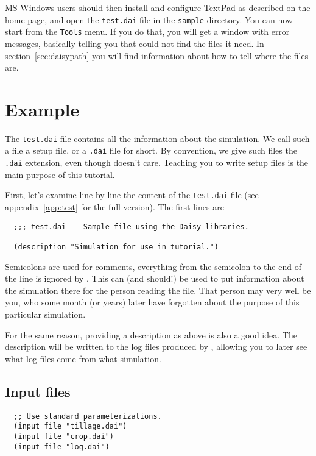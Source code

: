 \documentclass[a4paper,11pt]{article}
\begin{document}
MS Windows users should then install and configure TextPad as
described on the \daisy{} home page, and open the \texttt{test.dai}
file in the \texttt{sample} directory.  You can now start \daisy{}
from the \texttt{Tools} menu.  If you do that, you will get a window
with error messages, basically telling you that \daisy{} could not
find the files it need.  In section~\ref{sec:daisypath} you will find
information about how to tell \daisy{} where the files are.

\section{Example}

The \texttt{test.dai} file contains all the information about the
simulation.  We call such a file a \daisy{} setup file, or a
\texttt{.dai} file for short.  By convention, we give such files the
\texttt{.dai} extension, even though \daisy{} doesn't care.  Teaching
you to write \daisy{} setup files is the main purpose of this
tutorial.

First, let's examine line by line the content of the \texttt{test.dai}
file (see appendix~\ref{app:test} for the full version).  The first
lines are

\begin{verbatim}
  ;;; test.dai -- Sample file using the Daisy libraries.

  (description "Simulation for use in tutorial.")
\end{verbatim}

Semicolons are used for comments, everything from the semicolon to the
end of the line is ignored by \daisy{}.  This can (and should!) be
used to put information about the simulation there for the person
reading the file.  That person may very well be you, who some month
(or years) later have forgotten about the purpose of this particular
simulation.

For the same reason, providing a description as above is also a good
idea.  The description will be written to the log files produced by
\daisy{}, allowing you to later see what log files come from what
simulation.

\subsection{Input files}
\label{sec:ex-input}

\begin{verbatim}
  ;; Use standard parameterizations.
  (input file "tillage.dai")
  (input file "crop.dai")
  (input file "log.dai")
\end{verbatim}
\end{document}
